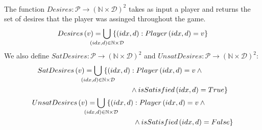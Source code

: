 \begin{definition} \ \\
  \label{desiresofplayer}
  The function $Desires : \mathcal{P} \rightarrow \left(\mathbb{N} \times \mathcal{D}\right)^2$ takes as input a player and
  returns the set of desires that the player was assinged throughout the game.
  \begin{equation*}
    Desires\left(v\right) = \bigcup\limits_{\mathclap{\left(idx, d\right) \in \mathbb{N} \times \mathcal{D}}} \; \{\left(idx,
    d\right) : Player\left(idx, d\right) = v\}
  \end{equation*}
  We also define $SatDesires : \mathcal{P} \rightarrow \left(\mathbb{N} \times \mathcal{D}\right)^2$ and $UnsatDesires :
  \mathcal{P} \rightarrow \left(\mathbb{N} \times \mathcal{D}\right)^2$:
  \begin{gather*}
    \begin{aligned}
      SatDesires\left(v\right) = \bigcup\limits_{\mathclap{\left(idx, d\right) \in \mathbb{N} \times \mathcal{D}}} \;
      \{\left(idx, d\right) &: Player\left(idx, d\right) = v \: \wedge \\
      &\wedge isSatisfied\left(idx, d\right) = True\}
    \end{aligned} \\
    \begin{aligned}
      UnsatDesires\left(v\right) = \bigcup\limits_{\mathclap{\left(idx, d\right) \in \mathbb{N} \times \mathcal{D}}} \;
      \{\left(idx, d\right) &: Player\left(idx, d\right) = v \: \wedge \\
      &\wedge isSatisfied\left(idx, d\right) = False\}
    \end{aligned}
  \end{gather*}
\end{definition}
